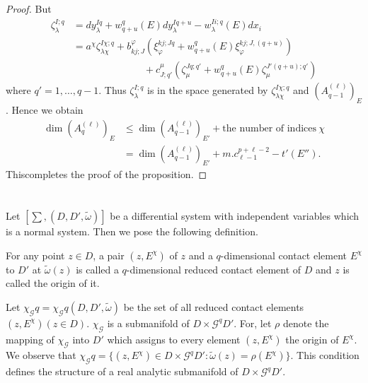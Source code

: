 \begin{proof}
 But
 \begin{align*}
   \zeta_{\lambda}^{I;q} &= dy_{\lambda}^{Iq} + w^q_{q+u} (E)
   dy_{\lambda}^{Iq+u} - w_{\lambda}^{Ii ; q}(E) dx_i\\ 
   &= a^\chi \zeta _{\lambda \chi}^{I \chi ; q} + b_{kj;J}^{\varphi}
   (\xi _{\varphi}^{kj; Jq} + w^q _{q+u} (E)
   \xi_{\varphi}^{kj;J,(q+u)})\\ 
   & \hspace{3cm}+ c^\mu_{J; q'} (\zeta _\mu ^{Jq;q'} +
   w_{q+u}^q (E) \zeta _{\mu}^{J'(q+u);q'}) 
 \end{align*}
 where $q' =1 , \ldots, q - 1$. Thus $\zeta_{\lambda}^{I;q}$ is in the
 space generated by $\zeta_{\lambda \chi}^{I \chi ;q}$ and
 $(A_{q-1}^{(\ell)})_E$. Hence we obtain 
 \begin{align*}
   \dim (A^{(\ell)} _{q})_{E} &\leq \dim (A_{q-1}^{(\ell)})_{E'} + \text{the
     number of indices} ~\chi\\ 
   & = \dim (A_{q-1}^{(\ell)})_{E'}+ m.c_{\ell -1}^{p+ \ell -2} - t'(E'').
 \end{align*}
This\pageoriginale completes the proof of the proposition.
\end{proof}

\section{}\label{chap3:sec3.9} %

Let $[\sum, (D, D', \tilde{\omega})]$ be a differential system with
independent variables which is a normal system. Then we pose the
following definition. 

\begin{defi*}
  For any point $z \in D$, a pair $(z, E^{\chi})$ of $z$ and a
  $q$-dimensional contact element $E^\chi$ to $D'$ at $\tilde{\omega}
  (z)$ is called a $q$-dimensional reduced  contact element of $D$ and
  $z$ is called the origin of it. 
\end{defi*}

Let $\chi_{\mathscr{G}} q = \chi_{\mathscr{G}} q (D, D',
\tilde{\omega})$ be the set of all reduced contact elements $(z,
E^\chi) (z \in D)$. $\chi_{\mathscr{G}}$ is a submanifold of $D \times
\mathscr{G}^q D'$. For, let $\rho$ denote the mapping of
$\chi_{\mathscr{G}}$ into $D'$ which assigns to every element $(z,
E^\chi)$ the origin of $E^\chi$. We observe that $\chi_{\mathscr{G}} q
= \{ (z, E^\chi) \in D \times \mathscr{G}^q D' : \tilde{\omega} (z) =
\rho (E^{\chi})\}$. This condition defines the structure  of a real
analytic submanifold of $D \times \mathscr{G}^q D'$. 

